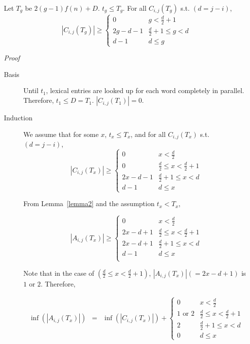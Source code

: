\begin{lemma}\label{lemma3}
Let $T_g$ be $2(g-1)f(n) +D$. $t_g \leq T_g$.  For all $C_{i,j}(T_g)$ s.t. $(d = j - i)$,
\[|C_{i,j}(T_g)| \geq
\left\{
\begin{array}{ll}
0		& g < \frac{d}{2} + 1\\
2g-d-1		& \frac{d}{2}+1 \leq g < d\\
d-1		& d \leq g
\end{array}
\right.
\]
\end{lemma}

{\it Proof} ~ ~
\begin{description}
\item [Basis] Until $t_1$, lexical entries are looked up for each word
completely in parallel.  Therefore, $t_1 \leq D = T_1$.  $|C_{i,j}(T_1)|
= 0$.

\item [Induction] We assume that for some $x$, $t_x \leq T_x$, and for
all $C_{i,j}(T_x)$ s.t. $(d = j - i)$,
\[|C_{i,j}(T_x)| \geq
\left\{
\begin{array}{ll}
0		& x < \frac{d}{2}\\
0		& \frac{d}{2} \leq x < \frac{d}{2} + 1\\
2x-d-1		& \frac{d}{2}+1 \leq x < d\\
d-1		& d \leq x
\end{array}
\right.
\]

  From Lemma~\ref{lemma2} and the assumption $t_x < T_x$,

\[|A_{i,j}(T_x)| \geq
\left\{
\begin{array}{ll}
0		& x < \frac{d}{2}\\
2x-d+1		& \frac{d}{2} \leq x < \frac{d}{2} + 1\\
2x-d+1		& \frac{d}{2}+1 \leq x < d\\
d-1		& d \leq x\\
\end{array}
\right.
\]

  Note that in the case of $(\frac{d}{2} \leq x < \frac{d}{2} + 1)$,
$|A_{i,j}(T_x)|(= 2x-d+1)$ is $1$ or $2$.  Therefore,

\begin{eqnarray*}
\inf (|A_{i,j}(T_x)|) & = & \inf (|C_{i,j}(T_x)|) +
\left\{
\begin{array}{ll}
0		& x < \frac{d}{2}\\
1 \mbox{ or } 2	& \frac{d}{2} \leq x < \frac{d}{2} + 1\\
2		& \frac{d}{2}+1 \leq x < d\\
0		& d \leq x
\end{array}
\right.\\
\end{eqnarray*}


\end{description}
